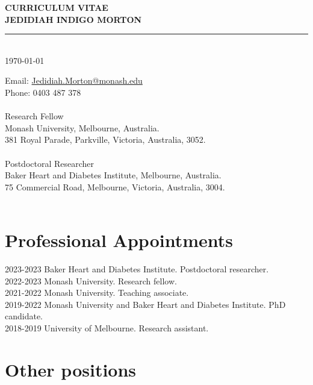 \documentclass[11pt]{article}
\newcommand{\thedate}{\today}
\begin{document}
\begin{titlepage}
    \begin{center}
        \Huge
        \textbf{CURRICULUM VITAE \\
JEDIDIAH INDIGO MORTON}
\rule{16cm}{2mm} \\
\Large
\thedate \\
       \vfill
    \end{center}
        \Large

\noindent
Email: \color{blue}
 \href{mailto:Jedidiah.Morton@Monash.edu}{Jedidiah.Morton@monash.edu} \\
\color{black}
Phone: \color{blue} 0403 487 378 \\
\color{black}
 \\
Research Fellow \\
Monash University, Melbourne, Australia. \\
381 Royal Parade, Parkville, Victoria, Australia, 3052. \\
 \\
Postdoctoral Researcher \\
Baker Heart and Diabetes Institute, Melbourne, Australia. \\
75 Commercial Road, Melbourne, Victoria, Australia, 3004. \\
\\
\end{titlepage}
\section*{Professional Appointments}

2023-\color{white}2023 \color{black} \hspace*{0.5cm} Baker Heart and Diabetes Institute. Postdoctoral researcher.  \\
2022-\color{white}2023 \color{black} \hspace*{0.5cm} Monash University. Research fellow. \\
2021-2022 \hspace*{0.5cm} Monash University. Teaching associate. \\
2019-2022 \hspace*{0.5cm} Monash University and Baker Heart and Diabetes Institute. PhD candidate. \\
2018-2019 \hspace*{0.5cm} University of Melbourne. Research assistant. \\

\section*{Other positions}
\end{document}
